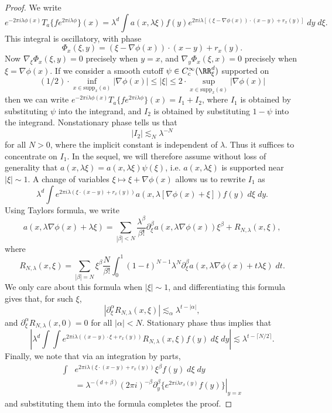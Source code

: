 \begin{proof}
    We write
    \[ e^{-2 \pi i \lambda \phi(x)} T_a \{ f e^{2 \pi i \lambda \phi} \}(x) = \lambda^d \int a(x, \lambda \xi) f(y) e^{2 \pi i \lambda [ (\xi - \nabla \phi(x)) \cdot (x - y) + r_x(y) ]}\; dy\; d\xi. \]
    This integral is oscillatory, with phase
    \[ \Phi_x(\xi,y) = (\xi - \nabla \phi(x)) \cdot (x - y) + r_x(y). \]
    Now $\nabla_\xi \Phi_x(\xi,y) = 0$ precisely when $y = x$, and $\nabla_y \Phi_x(\xi,x) = 0$ precisely when $\xi = \nabla \phi(x)$. If we consider a smooth cutoff $\psi \in C_c^\infty(\RR^d_\xi)$ supported on
    \[ (1/2) \cdot \inf_{x \in \text{supp}_x(a)} |\nabla \phi(x)| \leq |\xi| \leq 2 \cdot \sup_{x \in \text{supp}_x(a)} |\nabla \phi(x)| \]
    then we can write $e^{-2 \pi i \lambda \phi(x)} T_a \{ f e^{2 \pi i \lambda \phi} \}(x) = I_1 + I_2$, where $I_1$ is obtained by substituting $\psi$ into the integrand, and $I_2$ is obtained by substituting $1 - \psi$ into the integrand. Nonstationary phase tells us that
    \[ |I_2| \lesssim_N \lambda^{-N} \]
    for all $N > 0$, where the implicit constant is independent of $\lambda$. Thus it suffices to concentrate on $I_1$. In the sequel, we will therefore assume without loss of generality that $a(x, \lambda \xi) = a(x, \lambda \xi) \psi(\xi)$, i.e. $a(x, \lambda \xi)$ is supported near $|\xi| \sim 1$. A change of variables $\xi \mapsto \xi + \nabla \phi(x)$ allows us to rewrite $I_1$ as
    \[ \lambda^d \int e^{2 \pi i \lambda ( \xi \cdot (x - y) + r_x(y) )} a(x, \lambda [\nabla \phi(x) + \xi]) f(y)\; d\xi\; dy. \]
    Using Taylors formula, we write
    \[ a(x, \lambda \nabla \phi(x) + \lambda \xi) = \sum_{|\beta| < N} \frac{\lambda^\beta}{\beta !} \partial_\xi^\beta a(x, \lambda \nabla \phi(x)) \xi^\beta + R_{N,\lambda}(x,\xi), \]
    where
    \[ R_{N,\lambda}(x,\xi) = \sum_{|\beta| = N} \xi^\beta \frac{N}{\beta!} \int_0^1 (1 - t)^{N-1} \lambda^N \partial^\beta_\xi a(x, \lambda \nabla \phi(x) + t \lambda \xi)\; dt. \]
    We only care about this formula when $|\xi| \sim 1$, and differentiating this formula gives that, for such $\xi$,
    \[ |\partial_\xi^\alpha R_{N,\lambda}(x,\xi)| \lesssim_\alpha \lambda^{t - |\alpha|}, \]
    and $\partial_\xi^\alpha R_{N,\lambda}(x,0) = 0$ for all $|\alpha| < N$. Stationary phase thus implies that
    \[ \left| \lambda^d \int \int e^{2 \pi i \lambda ((x - y) \cdot \xi + r_x(y))} R_{N,\lambda}(x,\xi) f(y)\; d\xi\; dy \right| \lesssim \lambda^{t - \lceil N/2 \rceil}. \]
    Finally, we note that via an integration by parts,
    \begin{align*}
        \int & e^{2 \pi i \lambda (\xi \cdot (x - y) + r_x(y))} \xi^\beta f(y)\; d\xi\; dy\\
        &= \lambda^{-(d + \beta)} (2 \pi i)^{-\beta} \left. \partial_y^\beta \{ e^{2 \pi i \lambda r_x(y)} f(y) \} \right|_{y = x}
    \end{align*}
    and substituting them into the formula completes the proof.
\end{proof}


